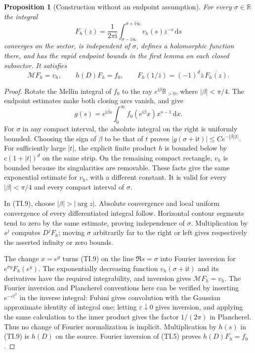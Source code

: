 \documentclass[11pt]{article}
\newtheorem{proposition}[theorem]{Proposition}
\newcommand{\M}{\mathcal M}
\newcommand{\ii}{\mathrm i}
\newcommand{\dd}{\,\mathrm d}
\begin{document}
\begin{proposition}[Construction without an endpoint assumption]
For every $\sigma\in\mathbb R$ the integral
\begin{equation}
 F_h(z)=\frac1{2\pi\ii}\int_{\sigma-\ii\infty}^{\sigma+\ii\infty}
 v_h(s)z^{-s}\dd s \tag{TI.9}
\end{equation}
converges on the sector, is independent of $\sigma$, defines a
holomorphic function there, and has the rapid endpoint bounds in the
first lemma on each closed subsector. It satisfies
\begin{equation}
 \M F_h=v_h,\qquad h(D)F_h=f_0,\qquad
 F_h(1/\bar z)=(-1)^d\bar z\,\overline{F_h(z)}. \tag{TI.10}
\end{equation}
\end{proposition}
\begin{proof}
Rotate the Mellin integral of $f_0$ to the ray $e^{\ii\beta}\mathbb R_{>0}$,
where $|\beta|<\pi/4$. The endpoint estimates make both closing arcs
vanish, and give
\[
 g(s)=e^{\ii\beta s}\int_0^\infty f_0(e^{\ii\beta}x)x^{s-1}\dd x.
\]
For $\sigma$ in any compact interval, the absolute integral on the
right is uniformly bounded. Choosing the sign of $\beta$ to be that
of $t$ proves $|g(\sigma+\ii t)|\le C e^{-|\beta||t|}$.
For sufficiently large $|t|$, the explicit finite product $h$ is
bounded below by $c(1+|t|)^d$ on the same strip. On the remaining
compact rectangle, $v_h$ is bounded because its singularities are
removable. These facts give the same exponential estimate for $v_h$,
with a different constant. It is valid for every
$|\beta|<\pi/4$ and every compact interval of $\sigma$.

In (TI.9), choose $|\beta|>|\arg z|$. Absolute convergence and local
uniform convergence of every differentiated integral follow.
Horizontal contour segments tend to zero by the same estimate, proving
independence of $\sigma$. Multiplication by $s^j$ computes $D^jF_h$;
moving $\sigma$ arbitrarily far to the right or left gives respectively
the asserted infinity or zero bounds.

The change $x=e^y$ turns (TI.9) on the line $\Re s=\sigma$ into Fourier
inversion for $e^{\sigma y}F_h(e^y)$. The exponentially decreasing
function $v_h(\sigma+\ii t)$ and its derivatives have the required
integrability, and inversion gives $\M F_h=v_h$. The Fourier inversion
and Plancherel conventions here can be verified by inserting
$e^{-\varepsilon t^2}$ in the inverse integral: Fubini gives convolution
with the Gaussian approximate identity of integral one; letting
$\varepsilon\downarrow0$ gives inversion, and applying the same
calculation to the inner product gives the factor $1/(2\pi)$ in
Plancherel. Thus no change of Fourier normalization is implicit.
Multiplication by $h(s)$ in (TI.9) is $h(D)$ on the source. Fourier
inversion of (TI.5) proves $h(D)F_h=f_0$.


\end{proof}
\end{document}
